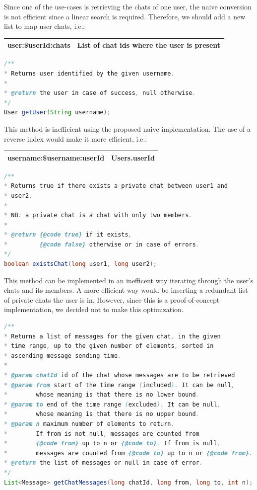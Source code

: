 \documentclass[10pt]{article}
\begin{document}
Since one of the use-cases is retrieving the chats of one user, the naive
conversion is not efficient since a linear search is required.
Therefore, we should add a new list to map user chats, i.e.:

\begin{center}
    \begin{tabular}{ | c | c | }
        \hline
        user:\$userId:chats & List of chat ids where the user is present \\\hline
    \end{tabular}
\end{center}

\begin{lstlisting}[language = Java]
/**
* Returns user identified by the given username.
*
* @return the user in case of success, null otherwise.
*/
User getUser(String username);
\end{lstlisting}

This method is inefficient using the proposed naive implementation. 
The use of a reverse index would make it more efficient, i.e.:

\begin{center}
    \begin{tabular}{ | c | c | }
        \hline
        username:\$username:userId & Users.userId \\\hline
    \end{tabular}
\end{center}

\begin{lstlisting}[language = Java]
/**
* Returns true if there exists a private chat between user1 and 
* user2.
*
* NB: a private chat is a chat with only two members.
*
* @return {@code true} if it exists, 
*         {@code false} otherwise or in case of errors.
*/
boolean existsChat(long user1, long user2);
\end{lstlisting}

This method can be implemented in an inefficent way iterating through the 
user's chats and its members. A more efficient way would be inserting a
redundant list of private chats the user is in.
However, since this is a proof-of-concept implementation, we decided not to
make this optimization.

\begin{lstlisting}[language = Java]
/**
* Returns a list of messages for the given chat, in the given 
* time range, up to the given number of elements, sorted in 
* ascending message sending time.
*
* @param chatId id of the chat whose messages are to be retrieved
* @param from start of the time range (included). It can be null, 
*        whose meaning is that there is no lower bound.
* @param to end of the time range (excluded). It can be null, 
*        whose meaning is that there is no upper bound.
* @param n maximum number of elements to return. 
*        If from is not null, messages are counted from 
*        {@code from} up to n or {@code to}. If from is null, 
*        messages are counted from {@code to} up to n or {@code from}.
* @return the list of messages or null in case of error.
*/
List<Message> getChatMessages(long chatId, long from, long to, int n);
\end{lstlisting}
\end{document}
